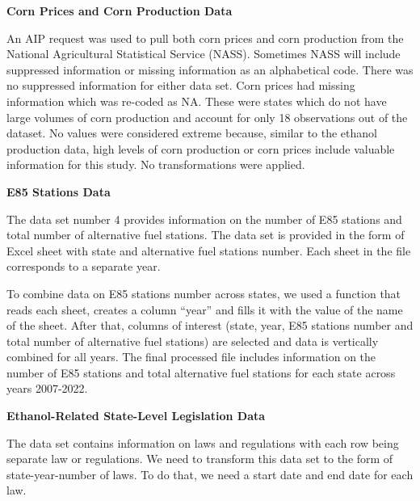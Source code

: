 \documentclass[
]{article}
\begin{document}
\textbf{Corn Prices and Corn Production Data}

An AIP request was used to pull both corn prices and corn production
from the National Agricultural Statistical Service (NASS). Sometimes
NASS will include suppressed information or missing information as an
alphabetical code. There was no suppressed information for either data
set. Corn prices had missing information which was re-coded as NA. These
were states which do not have large volumes of corn production and
account for only 18 observations out of the dataset. No values were
considered extreme because, similar to the ethanol production data, high
levels of corn production or corn prices include valuable information
for this study. No transformations were applied.

\textbf{E85 Stations Data}

The data set number 4 provides information on the number of E85 stations
and total number of alternative fuel stations. The data set is provided
in the form of Excel sheet with state and alternative fuel stations
number. Each sheet in the file corresponds to a separate year.

To combine data on E85 stations number across states, we used a function
that reads each sheet, creates a column ``year'' and fills it with the
value of the name of the sheet. After that, columns of interest (state,
year, E85 stations number and total number of alternative fuel stations)
are selected and data is vertically combined for all years. The final
processed file includes information on the number of E85 stations and
total alternative fuel stations for each state across years 2007-2022.

\textbf{Ethanol-Related State-Level Legislation Data}

The data set contains information on laws and regulations with each row
being separate law or regulations. We need to transform this data set to
the form of state-year-number of laws. To do that, we need a start date
and end date for each law.
\end{document}
